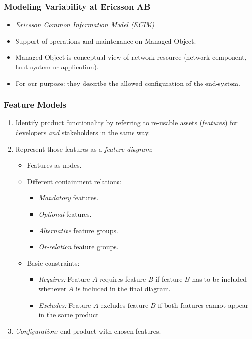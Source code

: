 \documentclass[swedish]{beamer}
\begin{document}
 \begin{frame}
  \frametitle{Modeling Variability at Ericsson AB}
  \begin{itemize}
   \item \emph{Ericsson Common Information Model (ECIM)}
   \item Support of operations and maintenance on Managed Object.
   \item Managed Object is conceptual view of network resource (network component, host system or application).
   \item For our purpose: they describe the allowed configuration of the end-system.
   \end{itemize} 
 \end{frame}
 
 \begin{frame}
  \frametitle{Feature Models}
  \begin{enumerate}
   \item Identify product functionality by referring to re-usable assets (\emph{features}) for developers \emph{and} stakeholders in the same way.
   \item Represent those features as a \emph{feature diagram}:
    \begin{itemize}
     \item Features as nodes.
     \item Different containment relations:
     \begin{itemize}
      \item \emph{Mandatory} features.
      \item \emph{Optional} features.
      \item \emph{Alternative} feature groups.
      \item \emph{Or-relation} feature groups.
     \end{itemize}
     \item Basic constraints:
     \begin{itemize}
      \item \emph{Requires:} Feature $A$ requires feature $B$ if feature $B$ has to be included whenever $A$ is included in the final diagram.
      \item \emph{Excludes:} Feature $A$ excludes feature $B$ if both features cannot appear in the same product
     \end{itemize}
    \end{itemize}
    \item \emph{Configuration:} end-product with chosen features.
    \end{enumerate}
   \end{frame}
   
\end{document}
